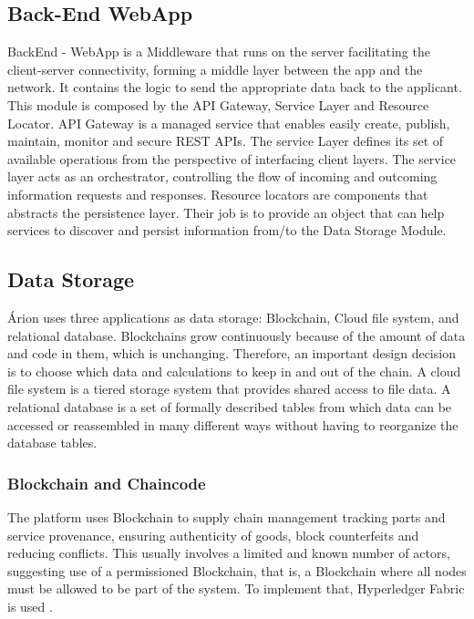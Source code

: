 \subsection{Back-End WebApp}\label{sec:WebAppBackEnd}
BackEnd - WebApp is a Middleware that runs on the server facilitating the client-server connectivity, forming a middle layer between the app and the network. It contains the logic to send the appropriate data back to the applicant. This module  is composed by the API Gateway, Service Layer and Resource Locator. API Gateway is a managed service that enables easily create, publish, maintain, monitor and secure REST APIs. The service Layer defines its set of available operations from the perspective of interfacing client layers. The service layer acts as an orchestrator, controlling the flow of incoming and outcoming information requests and responses. Resource locators are components that abstracts the persistence layer. Their job is to provide an object that can help services to discover and persist information from/to the Data Storage Module.

\subsection{Data Storage}\label{sec:DataStorage}
Árion uses three applications as data storage: Blockchain, Cloud file system, and relational database. Blockchains grow continuously because of the amount of data and code in them, which is unchanging. Therefore, an important design decision is to choose which data and calculations to keep in and out of the chain. A cloud file system is a tiered storage system that provides shared access to file data. A relational database is a set of formally described tables from which data can be accessed or reassembled in many different ways without having to reorganize the database tables. 

\subsubsection{Blockchain and Chaincode}\label{sec:DataStorageBlockchain}
The platform uses Blockchain to supply chain management tracking parts and service provenance, ensuring authenticity of goods, block counterfeits and reducing conflicts. This usually involves a limited and known number of actors, suggesting use of a permissioned Blockchain, that is, a Blockchain where all nodes must be allowed to be part of the system. To implement that, Hyperledger Fabric is used \cite{cachin2016architecture}. 

